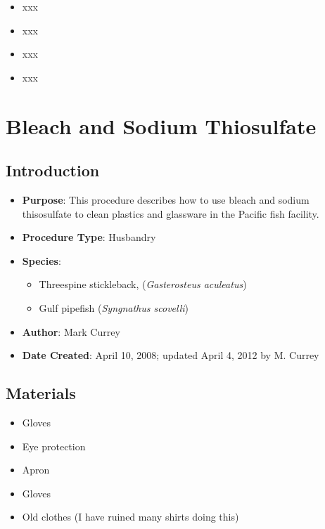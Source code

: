 \documentclass[
  letterpaper,
  DIV=11,
  numbers=noendperiod]{scrreprt}
\providecommand{\tightlist}{%
  \setlength{\itemsep}{0pt}\setlength{\parskip}{0pt}}\usepackage{longtable,booktabs,array}
\begin{document}
\begin{itemize}
\tightlist
\item
  xxx
\item
  xxx
\item
  xxx
\item
  xxx
\end{itemize}

\hypertarget{sec-husbandry-plastic_glassware_cleaning}{%
\chapter{Bleach and Sodium
Thiosulfate}\label{sec-husbandry-plastic_glassware_cleaning}}

\hypertarget{introduction-31}{%
\section{Introduction}\label{introduction-31}}

\begin{itemize}
\tightlist
\item
  \textbf{Purpose}: This procedure describes how to use bleach and
  sodium thisosulfate to clean plastics and glassware in the Pacific
  fish facility.
\item
  \textbf{Procedure Type}: Husbandry
\item
  \textbf{Species}:

  \begin{itemize}
  \tightlist
  \item
    Threespine stickleback, (\emph{Gasterosteus aculeatus})
  \item
    Gulf pipefish (\emph{Syngnathus scovelli})
  \end{itemize}
\item
  \textbf{Author}: Mark Currey
\item
  \textbf{Date Created}: April 10, 2008; updated April 4, 2012 by M.
  Currey
\end{itemize}

\hypertarget{materials-31}{%
\section{Materials}\label{materials-31}}

\begin{itemize}
\tightlist
\item
  Gloves
\item
  Eye protection
\item
  Apron
\item
  Gloves
\item
  Old clothes (I have ruined many shirts doing this)
\end{itemize}
\end{document}
